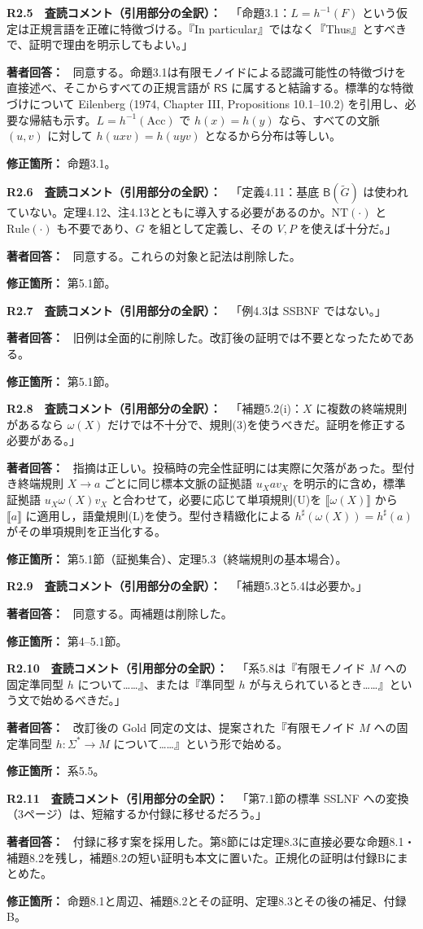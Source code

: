 \documentclass[10pt,a4paper]{ltjsarticle}
\newcommand{\NT}[1]{\llbracket #1\rrbracket}
\newcommand{\Comment}[1]{\par\medskip\noindent\textbf{#1　査読コメント（引用部分の全訳）：}\ }
\newcommand{\Reply}{\par\noindent\textbf{著者回答：}\ }
\newcommand{\Location}[1]{\par\noindent\textbf{修正箇所：} #1\par}
\newcommand{\RS}{\mathsf{RS}}
\begin{document}
\Comment{R2.5}
「命題3.1：$L=h^{-1}(F)$ という仮定は正規言語を正確に特徴づける。『In particular』ではなく『Thus』とすべきで、証明で理由を明示してもよい。」

\Reply
同意する。命題3.1は有限モノイドによる認識可能性の特徴づけを直接述べ、そこからすべての正規言語が $\RS$ に属すると結論する。標準的な特徴づけについて Eilenberg (1974, Chapter III, Propositions 10.1--10.2) を引用し、必要な帰結も示す。$L=h^{-1}(\mathrm{Acc})$ で $h(x)=h(y)$ なら、すべての文脈 $(u,v)$ に対して $h(uxv)=h(uyv)$ となるから分布は等しい。
\Location{命題3.1。}

\Comment{R2.6}
「定義4.11：基底 $\mathsf B(\widetilde G)$ は使われていない。定理4.12、注4.13とともに導入する必要があるのか。$\mathrm{NT}(\cdot)$ と $\mathrm{Rule}(\cdot)$ も不要であり、$G$ を組として定義し、その $V,P$ を使えば十分だ。」

\Reply
同意する。これらの対象と記法は削除した。
\Location{第5.1節。}

\Comment{R2.7}
「例4.3は SSBNF ではない。」

\Reply
旧例は全面的に削除した。改訂後の証明では不要となったためである。
\Location{第5.1節。}

\Comment{R2.8}
「補題5.2(i)：$X$ に複数の終端規則があるなら $\omega(X)$ だけでは不十分で、規則(3)を使うべきだ。証明を修正する必要がある。」

\Reply
指摘は正しい。投稿時の完全性証明には実際に欠落があった。型付き終端規則 $X\to a$ ごとに同じ標本文脈の証拠語 $u_Xav_X$ を明示的に含め，標準証拠語 $u_X\omega(X)v_X$ と合わせて，必要に応じて単項規則(U)を $\NT{\omega(X)}$ から $\NT{a}$ に適用し，語彙規則(L)を使う。型付き精緻化による $h^\sharp(\omega(X))=h^\sharp(a)$ がその単項規則を正当化する。
\Location{第5.1節（証拠集合）、定理5.3（終端規則の基本場合）。}

\Comment{R2.9}
「補題5.3と5.4は必要か。」

\Reply
同意する。両補題は削除した。
\Location{第4--5.1節。}

\Comment{R2.10}
「系5.8は『有限モノイド $M$ への固定準同型 $h$ について……』、または『準同型 $h$ が与えられているとき……』という文で始めるべきだ。」

\Reply
改訂後の Gold 同定の文は、提案された『有限モノイド $M$ への固定準同型 $h:\Sigma^*\to M$ について……』という形で始める。
\Location{系5.5。}

\Comment{R2.11}
「第7.1節の標準 SSLNF への変換（3ページ）は、短縮するか付録に移せるだろう。」

\Reply
付録に移す案を採用した。第8節には定理8.3に直接必要な命題8.1・補題8.2を残し，補題8.2の短い証明も本文に置いた。正規化の証明は付録Bにまとめた。
\Location{命題8.1と周辺、補題8.2とその証明、定理8.3とその後の補足、付録B。}

\end{document}
